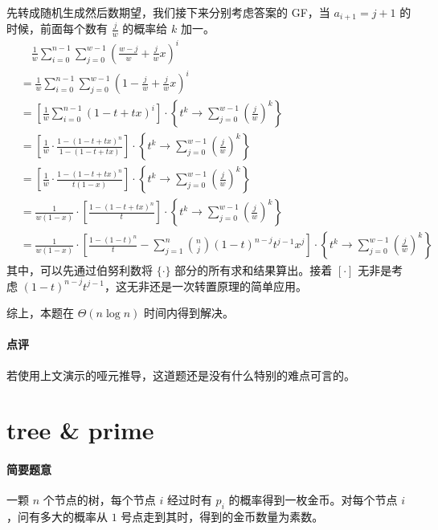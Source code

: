 \documentclass[12pt]{ctexart}
\theoremstyle{theorem}
\theoremstyle{theorem}
\begin{document}
先转成随机生成然后数期望，我们接下来分别考虑答案的 GF，当 $a_{i+1}=j+1$ 的时候，前面每个数有 $\frac jw$ 的概率给 $k$ 加一。
\begin{align*}
&\quad \frac 1w\sum_{i=0}^{n-1} \sum_{j=0}^{w-1} \left(\frac {w-j}w + \frac jw x\right)^i\\
&= \frac 1w\sum_{i=0}^{n-1} \sum_{j=0}^{w-1} \left(1 - \frac jw + \frac jw x\right)^i\\
&= \left[\frac 1w\sum_{i=0}^{n-1} \left(1 - t + t x\right)^i\right] \cdot \left\{ t^k \rightarrow \sum_{j=0}^{w-1} \left(\frac j w\right)^k \right\}\\
&= \left[\frac 1w \cdot \frac{1 - \left(1 - t + t x\right)^n}{1 -  \left(1 - t + t x\right)} \right] \cdot \left\{ t^k \rightarrow \sum_{j=0}^{w-1} \left(\frac j w\right)^k \right\}\\
&= \left[\frac 1w \cdot \frac{1 - \left(1 - t + t x\right)^n}{t(1-x)} \right] \cdot \left\{ t^k \rightarrow \sum_{j=0}^{w-1} \left(\frac j w\right)^k \right\}\\
&= \frac 1{w(1-x)} \cdot \left[\frac{1 - \left(1 - t + t x\right)^n}{t} \right] \cdot \left\{ t^k \rightarrow \sum_{j=0}^{w-1} \left(\frac j w\right)^k \right\}\\
&= \frac 1{w(1-x)} \cdot \left[\frac{1 - \left(1 - t\right)^n}{t} - \sum_{j=1}^n \binom n j (1-t)^{n-j}t^{j-1} x^j \right] \cdot \left\{ t^k \rightarrow \sum_{j=0}^{w-1} \left(\frac j w\right)^k \right\}
\end{align*}
其中，可以先通过伯努利数将 $\{\cdot \}$ 部分的所有求和结果算出。接着 $[ \cdot ]$ 无非是考虑 $(1-t)^{n-j}t^{j-1}$，这无非还是一次转置原理的简单应用。

综上，本题在 $\Theta(n\log n)$ 时间内得到解决。

\paragraph{点评} 若使用上文演示的哑元推导，这道题还是没有什么特别的难点可言的。

\newpage

\section{tree \& prime}

\paragraph{简要题意}

一颗 $n$ 个节点的树，每个节点 $i$ 经过时有 $p_i$ 的概率得到一枚金币。对每个节点 $i$，问有多大的概率从 $1$ 号点走到其时，得到的金币数量为素数。
\end{document}

